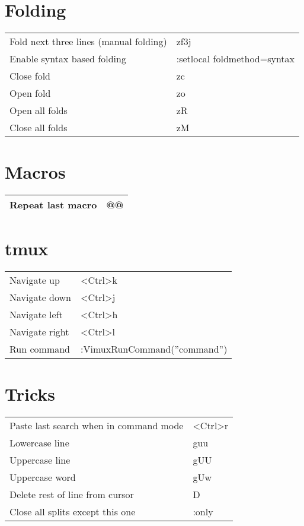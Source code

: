 \documentclass[a4paper]{report}
\def \tablewidth {10cm}
\begin{document}
\section{Folding}
\begin{tabularx}{\tablewidth}{| X | l |}
  \hline
  Fold next three lines (manual folding) & zf3j \\
  Enable syntax based folding & :setlocal foldmethod=syntax \\
  Close fold & zc \\
  Open fold & zo \\
  Open all folds & zR \\
  Close all folds & zM \\
  \hline
\end{tabularx}

\section{Macros}
\begin{tabularx}{\tablewidth}{| X | l |}
  \hline
  Repeat last macro & @@ \\
  \hline
\end{tabularx}

\section{tmux}
\begin{tabularx}{\tablewidth}{| X | l |}
  \hline
  Navigate up & \textless Ctrl\textgreater k \\
  Navigate down & \textless Ctrl\textgreater j \\
  Navigate left & \textless Ctrl\textgreater h \\
  Navigate right & \textless Ctrl\textgreater l \\
  Run command & :VimuxRunCommand(''command'') \\
  \hline
\end{tabularx}

\section{Tricks}
\begin{tabularx}{\tablewidth}{| X | l |}
  \hline
  Paste last search when in command mode & \textless Ctrl\textgreater r \\
  Lowercase line & guu \\
  Uppercase line & gUU \\
  Uppercase word & gUw \\
  Delete rest of line from cursor & D \\
  Close all splits except this one & :only \\
  \hline
\end{tabularx}
\end{document}
